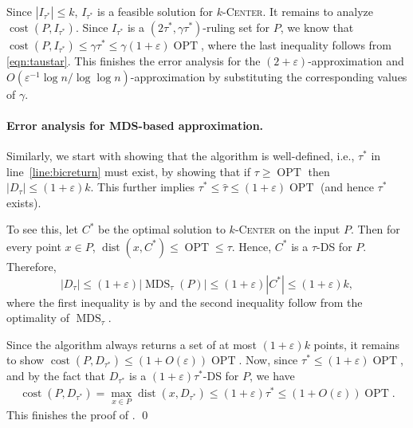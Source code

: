 \documentclass[11pt,letterpaper]{article}
\theoremstyle{plain}
\theoremstyle{definition}
\theoremstyle{remark}
\newcommand{\ProblemName}[1]{\textsc{#1}}
\newcommand{\kCenter}{$k$-\ProblemName{Center}\xspace}
\DeclareMathOperator{\cost}{cost}
\DeclareMathOperator{\OPT}{OPT}
\DeclareMathOperator{\dist}{dist}
\DeclareMathOperator{\MDS}{MDS}
\renewcommand{\epsilon}{\ensuremath{\varepsilon}}
\let\epsilon\varepsilon
\begin{document}
Since $|I_{\tau^*}|\leq k$, $I_{\tau^*}$ is a feasible solution for \kCenter. 
It remains to analyze $\cost(P, I_{\tau^*})$. 
Since $I_{\tau^*}$ is a $(2\tau^{*}, \gamma\tau^{*})$-ruling set for $P$, we know that $\cost(P, I_{\tau^{*}})\leq \gamma\tau^{*}\leq \gamma(1+\varepsilon)\OPT$, where the last inequality follows from \eqref{eqn:taustar}.
This finishes the error analysis for the $(2 + \epsilon)$-approximation and $O(\epsilon^{-1}\log n/ \log \log n)$-approximation by substituting the corresponding values of $\gamma$.   








\paragraph{Error analysis for MDS-based approximation.}
Similarly, we start with showing that the algorithm is well-defined, i.e., $\tau^*$ in line~\ref{line:bicreturn} must exist,
by showing that if $\tau \geq \OPT$ then $|D_\tau| \leq (1 + \epsilon) k$.
This further implies $\tau^* \leq \hat{\tau} \leq (1 + \epsilon) \OPT$ (and hence $\tau^*$ exists). 

To see this, let $C^*$ be the optimal solution to \kCenter on the input $P$. 
Then for every point $x\in P$, $\dist(x, C^*)\leq \OPT \leq \tau$.
Hence, $C^*$ is a $\tau$-DS for $P$. 
Therefore, 
\begin{equation*}
    |D_{\tau}|\leq (1+\varepsilon)|\MDS_{\tau}(P)|\leq (1+\varepsilon)|C^*|\leq (1+\varepsilon)k,
\end{equation*} 
where the first inequality is by  and the second inequality follow from the optimality of $\MDS_\tau$. 

Since the algorithm always returns a set of at most $(1 + \epsilon)k$ points, it remains to show $\cost(P, D_{\tau^*}) \leq (1 + O(\epsilon)) \OPT$.
Now, since $\tau^* \leq (1 + \epsilon) \OPT$, and by the fact that $D_{\tau^*}$ is a $(1 + \epsilon)\tau^*$-DS for $P$, we have
\begin{align*}
    \cost(P, D_{\tau^*})
    = \max_{x \in P} \dist(x, D_{\tau^*}) 
    \leq (1 + \epsilon) \tau^* 
    \leq (1 + O(\epsilon)) \OPT.
\end{align*}
This finishes the proof of . 
\qed
\end{document}
